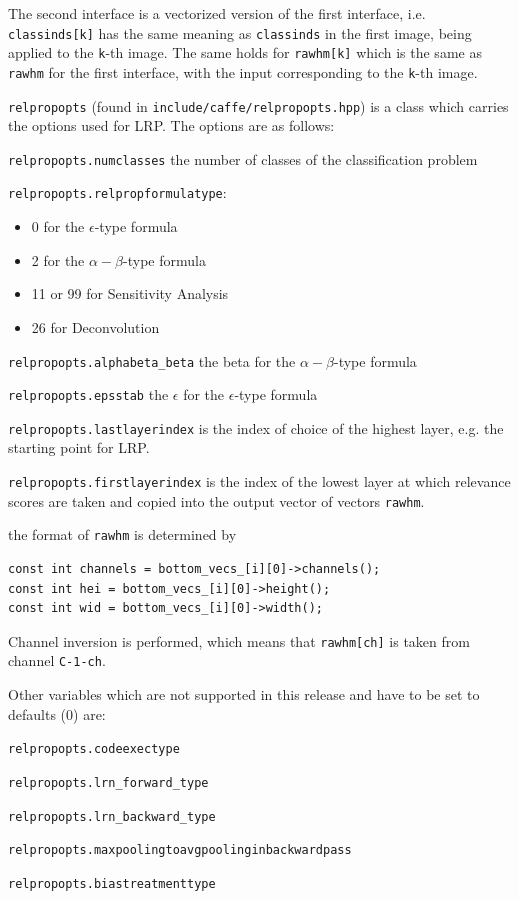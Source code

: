 \documentclass[a4wide]{article}
\begin{document}
\begin{itemize}
The second interface is a vectorized version of the first interface, i.e. \texttt{classinds[k]} has the same meaning as \texttt{classinds} in the first image, being applied to the \texttt{k}-th image. The same holds for \texttt{rawhm[k]} which is the same as \texttt{rawhm} for the first interface, with the input corresponding to the \texttt{k}-th image.

\texttt{relpropopts} (found in \texttt{include/caffe/relpropopts.hpp}) is a class which carries the options used for LRP. The options are as follows:

\texttt{relpropopts.numclasses} the number of classes of  the classification problem

\texttt{relpropopts.relpropformulatype}:
\begin{itemize}
\item 0 for the $\epsilon$-type formula
\item 2 for the $\alpha-\beta$-type formula
\item 11 or 99 for Sensitivity Analysis \cite{DBLP:journals/corr/SimonyanVZ13}
\item 26 for Deconvolution \cite{DBLP:conf/eccv/ZeilerF14}
\end{itemize}


\texttt{relpropopts.alphabeta\_beta} the beta for the $\alpha-\beta$-type formula

\texttt{relpropopts.epsstab} the $\epsilon$ for the $\epsilon$-type formula

\texttt{relpropopts.lastlayerindex} is the index of choice of the highest layer, e.g. the starting point for LRP.

\texttt{relpropopts.firstlayerindex} is the index of the lowest layer at which relevance scores are taken and copied into the output vector of vectors \texttt{rawhm}. 

the format of \texttt{rawhm} is determined by 
\begin{verbatim}
const int channels = bottom_vecs_[i][0]->channels();
const int hei = bottom_vecs_[i][0]->height();
const int wid = bottom_vecs_[i][0]->width();
\end{verbatim}

Channel inversion is performed, which means that \texttt{rawhm[ch]} is taken from channel \texttt{C-1-ch}.

Other variables which are not supported in this release and have to be set to defaults (0) are:

\texttt{relpropopts.codeexectype}

\texttt{relpropopts.lrn\_forward\_type}

\texttt{relpropopts.lrn\_backward\_type}

\texttt{relpropopts.maxpoolingtoavgpoolinginbackwardpass}

\texttt{relpropopts.biastreatmenttype}




\end{itemize}
\end{document}
